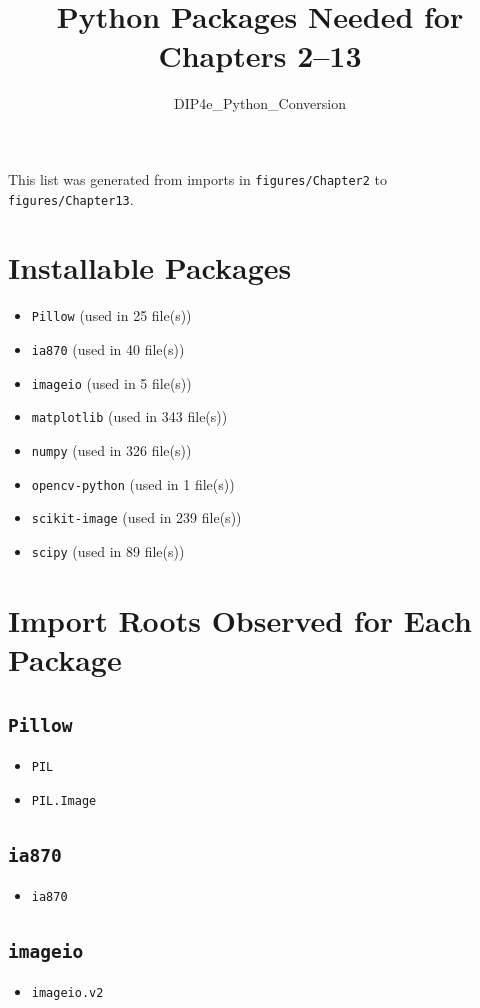 \documentclass[11pt]{article}
\title{Python Packages Needed for Chapters 2--13}
\author{DIP4e\_Python\_Conversion}
\date{}
\begin{document}
\maketitle
This list was generated from imports in \texttt{figures/Chapter2} to \texttt{figures/Chapter13}.
\section*{Installable Packages}
\begin{itemize}[leftmargin=1.5em]
\item \texttt{Pillow} (used in 25 file(s))
\item \texttt{ia870} (used in 40 file(s))
\item \texttt{imageio} (used in 5 file(s))
\item \texttt{matplotlib} (used in 343 file(s))
\item \texttt{numpy} (used in 326 file(s))
\item \texttt{opencv-python} (used in 1 file(s))
\item \texttt{scikit-image} (used in 239 file(s))
\item \texttt{scipy} (used in 89 file(s))
\end{itemize}
\section*{Import Roots Observed for Each Package}
\subsection*{\texttt{Pillow}}
\begin{itemize}[leftmargin=1.5em]
\item \texttt{PIL}
\item \texttt{PIL.Image}
\end{itemize}
\subsection*{\texttt{ia870}}
\begin{itemize}[leftmargin=1.5em]
\item \texttt{ia870}
\end{itemize}
\subsection*{\texttt{imageio}}
\begin{itemize}[leftmargin=1.5em]
\item \texttt{imageio.v2}
\end{itemize}
\end{document}
